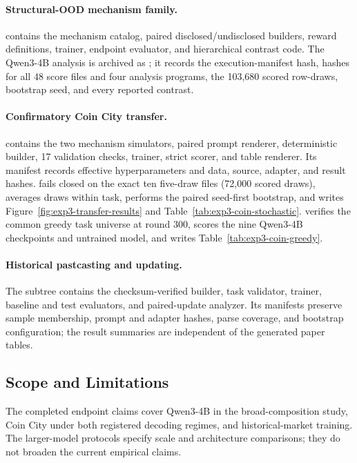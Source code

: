 \paragraph{Structural-OOD mechanism family.}
 contains the mechanism catalog,
paired disclosed/undisclosed builders, reward definitions, trainer, endpoint
evaluator, and hierarchical contrast code. The Qwen3-4B analysis is
archived as ; it records the
execution-manifest hash, hashes for all 48 score files and four analysis programs,
the 103,680 scored row-draws, bootstrap seed, and every reported contrast.

\paragraph{Confirmatory Coin City transfer.}
 contains the two mechanism
simulators, paired prompt renderer, deterministic builder, 17 validation checks,
trainer, strict scorer, and table renderer. Its manifest records effective
hyperparameters and data, source, adapter, and result hashes.
 fails closed on the exact ten
five-draw files (72,000 scored draws), averages draws within task, performs the
paired seed-first bootstrap, and writes Figure~\ref{fig:exp3-transfer-results}
and Table~\ref{tab:exp3-coin-stochastic}. 
verifies the common greedy task universe at round 300, scores the nine Qwen3-4B
checkpoints and untrained model, and writes Table~\ref{tab:exp3-coin-greedy}.

\paragraph{Historical pastcasting and updating.}
The  subtree contains the checksum-verified builder,
task validator, trainer, baseline and test evaluators, and paired-update analyzer.
Its manifests preserve sample membership, prompt and adapter hashes, parse
coverage, and bootstrap configuration; the result summaries are independent of
the generated paper tables.

\subsection{Scope and Limitations}
\label{app:exp3-limitations}

The completed endpoint claims cover Qwen3-4B in the broad-composition study,
Coin City under both registered decoding regimes, and historical-market training.
The larger-model protocols specify scale and architecture comparisons; they do
not broaden the current empirical claims.

